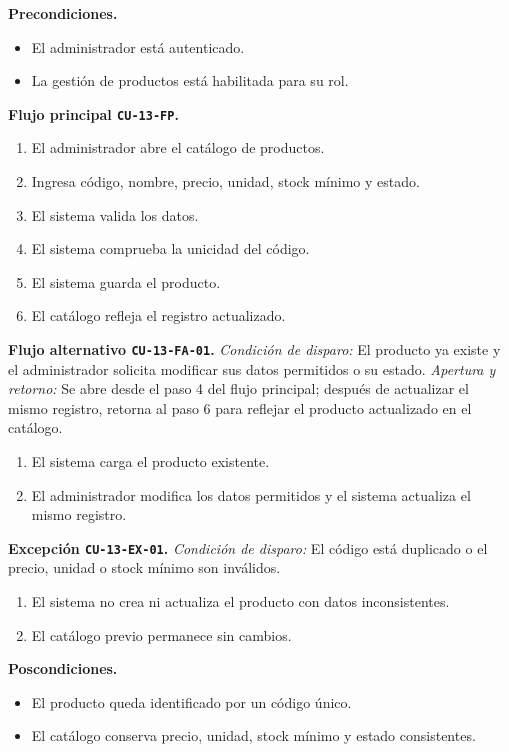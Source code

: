 \documentclass[11pt,a4paper,twoside]{article}
\begin{document}
\textbf{Precondiciones.}
\begin{itemize}
\item El administrador está autenticado.
\item La gestión de productos está habilitada para su rol.
\end{itemize}

\textbf{Flujo principal \texttt{CU-13-FP}.}
\begin{enumerate}
\item El administrador abre el catálogo de productos.
\item Ingresa código, nombre, precio, unidad, stock mínimo y estado.
\item El sistema valida los datos.
\item El sistema comprueba la unicidad del código.
\item El sistema guarda el producto.
\item El catálogo refleja el registro actualizado.
\end{enumerate}

\textbf{Flujo alternativo \texttt{CU-13-FA-01}.} \textit{Condición de disparo:} El producto ya existe y el administrador solicita modificar sus datos permitidos o su estado. \textit{Apertura y retorno:} Se abre desde el paso 4 del flujo principal; después de actualizar el mismo registro, retorna al paso 6 para reflejar el producto actualizado en el catálogo.
\begin{enumerate}[label=\alph*.]
\item El sistema carga el producto existente.
\item El administrador modifica los datos permitidos y el sistema actualiza el mismo registro.
\end{enumerate}

\textbf{Excepción \texttt{CU-13-EX-01}.} \textit{Condición de disparo:} El código está duplicado o el precio, unidad o stock mínimo son inválidos.
\begin{enumerate}[label=\alph*.]
\item El sistema no crea ni actualiza el producto con datos inconsistentes.
\item El catálogo previo permanece sin cambios.
\end{enumerate}

\textbf{Poscondiciones.}
\begin{itemize}
\item El producto queda identificado por un código único.
\item El catálogo conserva precio, unidad, stock mínimo y estado consistentes.
\end{itemize}
\end{document}
